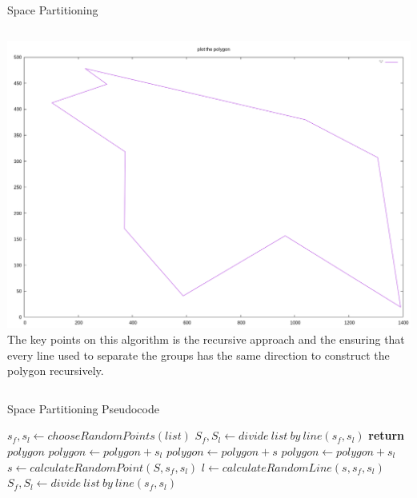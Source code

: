 \documentclass{beamer}
\begin{document}
\begin{frame}{Space Partitioning}
  \begin{block}{}
    \begin{columns}[onlytextwidth,T]
      \column{\dimexpr\linewidth-40mm}
      \includegraphics[width=0.5\paperwidth]{figures/kk-space-partitioning-10-0-0.png}
      \column{40mm}
      The key points on this algorithm is the recursive approach and the
      ensuring that every line used to separate the groups has the same
      direction to construct the polygon recursively.
    \end{columns}
  \end{block}
\end{frame}

\begin{frame}{Space Partitioning Pseudocode}
  \begin{algorithm}[H]
    \scriptsize
    \begin{algorithmic}[0]
        \State $s_f,s_l \gets chooseRandomPoints(list)$ 
        \State $S_f, S_l \gets divide\ list\ by\ line(s_f, s_l)$
        \State {}
        \State {}
        \State \textbf{return} $polygon$
      \EndProcedure
      \vspace{3pt}
          \State $polygon \gets polygon + s_l$
          \State $polygon \gets polygon + s$ 
          \State $polygon \gets polygon + s_l$
        \Else
          \State $s \gets calculateRandomPoint(S, s_f, s_l)$
          \State $l \gets calculateRandomLine(s, s_f, s_l)$
          \State $S_f, S_l \gets divide\ list\ by\ line(s_f, s_l)$
          \State {}
          \State {}
        \EndIf
      \EndProcedure
    \end{algorithmic}
  \end{algorithm}
\end{frame}
\end{document}
